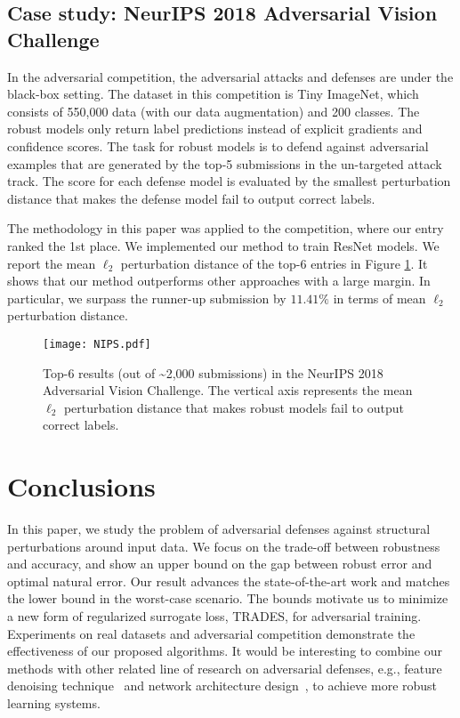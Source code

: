 \documentclass[11pt]{article}
\newcommand{\0}{\mathbf{0}}
\newcommand{\1}{\mathbf{1}}
\begin{document}
\subsection{Case study: NeurIPS 2018 Adversarial Vision Challenge}

\medskip
{}
In the adversarial competition, the adversarial attacks and defenses are under the black-box setting. The dataset in this competition is Tiny ImageNet, which consists of 550,000 data (with our data augmentation) and 200 classes. The robust models only return label predictions instead of explicit gradients and confidence scores.
The task for robust models is to defend against adversarial examples that are generated by the top-5 submissions in the un-targeted attack track. The score for each defense model is evaluated by the smallest perturbation distance that makes the defense model fail to output correct labels.

\medskip
{}
The methodology in this paper was applied to the competition, where our entry ranked the 1st place. We implemented our method to train ResNet models.
We report the mean $\ell_2$ perturbation distance of the top-6 entries in Figure \ref{figure: NIPS competition}. It shows that our method outperforms other approaches with a large margin. In particular, we surpass the runner-up submission by $11.41\%$ in terms of mean $\ell_2$ perturbation distance.

\begin{figure}
\centering
\texttt{[image: NIPS.pdf]}
\caption{Top-6 results (out of \textasciitilde2,000 submissions) in the NeurIPS 2018 Adversarial Vision Challenge. The vertical axis represents the mean $\ell_2$ perturbation distance that makes robust models fail to output correct labels.}
\label{figure: NIPS competition}
\end{figure}

\section{Conclusions}

In this paper, we study the problem of adversarial defenses against structural perturbations around input data. We focus on the trade-off between robustness and accuracy, and show an upper bound on the gap between robust error and optimal natural error. Our
result advances the state-of-the-art work and matches the lower bound in the worst-case scenario. The bounds motivate us to minimize a new form of regularized surrogate loss, TRADES, for adversarial training. Experiments on real datasets and adversarial competition demonstrate the effectiveness of our proposed algorithms.
It would be interesting to combine our methods with other related line of research on adversarial defenses, e.g., feature denoising technique~\cite{xie2018feature} and network architecture design~\cite{cisse2017parseval}, to achieve more robust learning systems.
\end{document}

